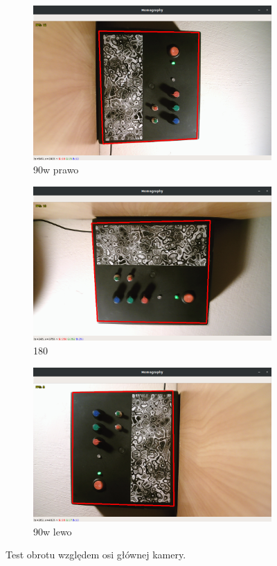 \documentclass[12pt,twoside,polish]{article}
\begin{document}
\begin{figure}[htb!]
	\begin{subfigure}[b]{0.5\textwidth}
		\includegraphics[width=\textwidth]{test_rot1}
		\caption{90\degree w prawo}
		\label{test_rot1}
	\end{subfigure}
	\begin{subfigure}[b]{0.5\textwidth}
		\includegraphics[width=\textwidth]{test_rot2}
		\caption{180\degree}
		\label{test_rot2}
	\end{subfigure}
	\begin{subfigure}[b]{0.5\textwidth}
		\includegraphics[width=\textwidth]{test_rot3}
		\caption{90\degree w lewo}
		\label{test_rot3}
	\end{subfigure}
	\caption{Test obrotu względem osi głównej kamery.}
\end{figure}
\FloatBarrier
\end{document}
